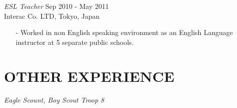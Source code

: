 \documentclass[margin, 10pt]{res} %
\begin{document}
\begin{resume}
{\sl ESL Teacher} \hfill Sep 2010 - May 2011 \\
Interac Co. LTD, Tokyo, Japan
\begin{itemize} \itemsep -2pt
\item[-] Worked in non English speaking environment as an English Language instructor at 5 separate public schools.
\end{itemize}


\section{OTHER EXPERIENCE} 

{\sl Eagle Scount, Boy Scout Troop 8} \\


\end{resume}
\end{document}

